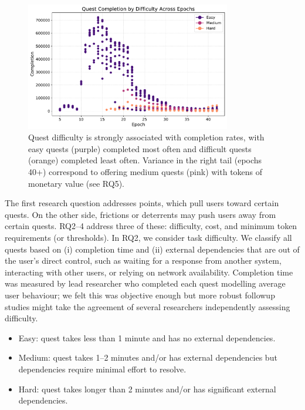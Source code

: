 \begin{figure}[t]
    \centering
    \includegraphics[width=0.8\textwidth]{figures/difficulty.pdf}
    \caption{Quest difficulty is strongly associated with completion rates, with easy quests (purple) completed most often and difficult quests (orange) completed least often. Variance in the right tail (epochs 40+) correspond to offering medium quests (pink) with tokens of monetary value (see RQ5).\label{fig:difficulty}}
\end{figure}

The first research question addresses points, which pull users toward certain quests. On the other side, frictions or deterrents may push users away from certain quests. RQ2--4 address three of these: difficulty, cost, and minimum token requirements (or thresholds). In RQ2, we consider task difficulty. We classify all quests based on (i) completion time and (ii) external dependencies that are out of the user's direct control, such as waiting for a response from another system, interacting with other users, or relying on network availability. Completion time was measured by lead researcher who completed each quest modelling average user behaviour; we felt this was objective enough but more robust followup studies might take the agreement of several researchers independently assessing difficulty.

\begin{itemize}
\item Easy: quest takes less than 1 minute and has no external dependencies.
\item Medium: quest takes 1--2 minutes and/or has external dependencies but dependencies require minimal effort to resolve.
\item Hard: quest takes longer than 2 minutes and/or has significant external dependencies.
\end{itemize}

